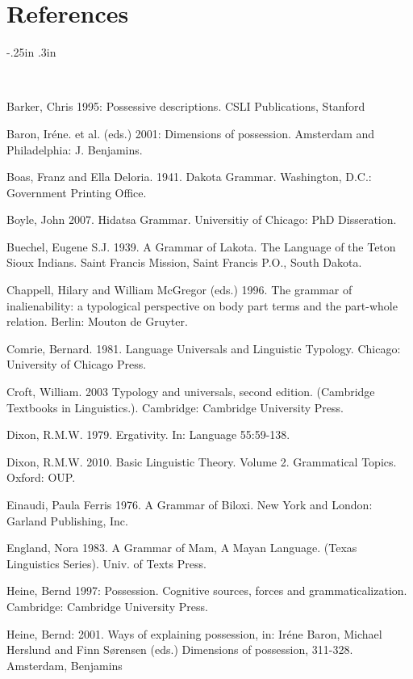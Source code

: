 \documentclass[output=paper]{LSP/langsci}
\begin{document}
\section*{References}

\newenvironment{reflist} {\begin{list} {} {\listparindent -.25in
\leftmargin .3in} \item \ \vspace{-.3in} } {\end{list} }

\begin{reflist}

Barker, Chris 1995: Possessive descriptions. CSLI Publications, Stanford

Baron, Iréne. et al. (eds.) 2001: Dimensions of possession. Amsterdam and Philadelphia: J. Benjamins.

Boas, Franz and Ella Deloria. 1941. Dakota Grammar. Washington, D.C.: Government Printing Office.

Boyle, John 2007. Hidatsa Grammar. Universitiy of Chicago: PhD Disseration.

Buechel, Eugene S.J. 1939. A Grammar of Lakota. The Language of the Teton Sioux Indians. Saint Francis Mission, Saint Francis P.O., South Dakota.

Chappell, Hilary and William McGregor (eds.) 1996. The grammar of inalienability: a typological perspective on body part terms and the part-whole relation. Berlin: Mouton de Gruyter.

Comrie, Bernard. 1981. Language Universals and Linguistic Typology. Chicago: University of Chicago Press.

Croft, William. 2003 Typology and universals, second edition. (Cambridge Textbooks in Linguistics.). Cambridge: Cambridge University Press.

Dixon, R.M.W. 1979. Ergativity. In: Language 55:59-138.

Dixon, R.M.W. 2010. Basic Linguistic Theory. Volume 2. Grammatical Topics. Oxford: OUP.

Einaudi, Paula Ferris 1976. A Grammar of Biloxi. New York and London: Garland Publishing, Inc.

England, Nora 1983. A Grammar of Mam, A Mayan Language. (Texas Linguistics Series). Univ. of Texts Press.

Heine, Bernd 1997: Possession. Cognitive sources, forces and grammaticalization. Cambridge: Cambridge University Press.

Heine, Bernd: 2001. Ways of explaining possession, in: Iréne Baron, Michael Herslund and Finn Sørensen (eds.) Dimensions of possession, 311-328. Amsterdam, Benjamins


\end{reflist}
\end{document}
